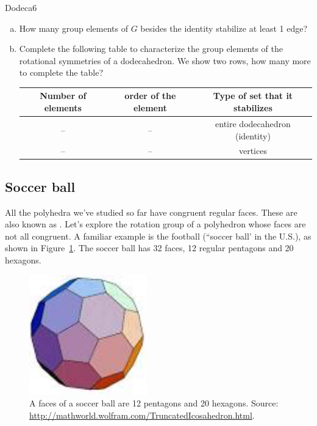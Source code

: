 \begin{exercise}{Dodeca6} 
\begin{enumerate}[(a)]
\item How many group elements of $G$ besides the identity stabilize at least 1 edge?
\item
Complete the following table to characterize the group elements of the rotational symmetries of a dodecahedron.  We show two rows, how many more to complete the table?  

\begin{tabular}{ |c |  c | c |}\hline
  Number of elements & order of the element & Type of set that it stabilizes \\ \hline
  --&  --& entire  dodecahedron (identity) \\ \hline
  -- & --&  vertices \\ 
\end{tabular}
\end{enumerate}
\end{exercise}

\subsection{Soccer ball}
All the polyhedra we've studied so far have congruent regular faces.  These are also known as .  Let's explore the rotation group of a polyhedron whose faces are not all congruent.  A familiar example is the football (``soccer ball' in the U.S.), as shown in  Figure~\ref{fig:Soccer}.  The soccer ball has 32 faces, 12 regular pentagons and 20 hexagons.  

\begin{figure}[ht]
\begin{center}
\includegraphics[width=2in]{images/Soccerball.png}
\caption{A faces of a soccer ball are 12 pentagons and 20 hexagons.  Source: \url{http://mathworld.wolfram.com/TruncatedIcosahedron.html}.
}
\label{fig:Soccer}
\end{center}
\end{figure}


